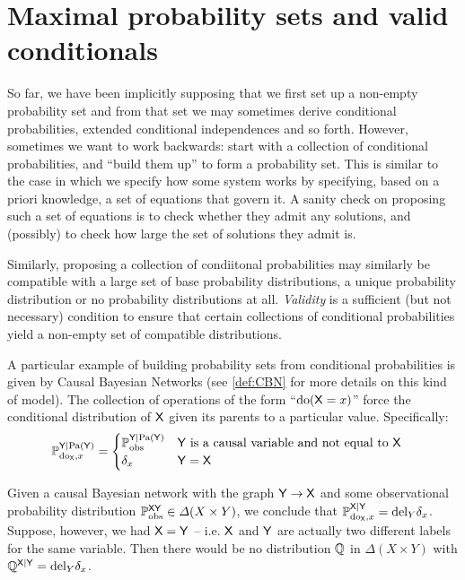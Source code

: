 \section{Maximal probability sets and valid conditionals}\label{sec:validity}

So far, we have been implicitly supposing that we first set up a non-empty probability set and from that set we may sometimes derive conditional probabilities, extended conditional independences and so forth. However, sometimes we want to work backwards: start with a collection of conditional probabilities, and ``build them up'' to form a probability set. This is similar to the case in which we specify how some system works by specifying, based on a priori knowledge, a set of equations that govern it. A sanity check on proposing such a set of equations is to check whether they admit any solutions, and (possibly) to check how large the set of solutions they admit is.

Similarly, proposing a collection of condiitonal probabilities may similarly be compatible with a large set of base probability distributions, a unique probability distribution or no probability distributions at all. \emph{Validity} is a sufficient (but not necessary) condition to ensure that certain collections of conditional probabilities yield a non-empty set of compatible distributions.

A particular example of building probability sets from conditional probabilities is given by Causal Bayesian Networks (see \ref{def:CBN} for more details on this kind of model). The collection of operations of the form ``$\mathrm{do}(\mathsf{X}=x)$'' force the conditional distribution of $\mathsf{X}$ given its parents to a particular value. Specifically:
\begin{align}
	\mathbb{P}_{\mathrm{do}_{\mathsf{X}},x}^{\mathsf{Y}|\mathrm{Pa}(\mathsf{Y})} &= \begin{cases}
	\mathbb{P}_{\mathrm{obs}}^{\mathsf{Y}|\mathrm{Pa}(\mathsf{Y})}&\mathsf{Y}\text{ is a causal variable and not equal to }\mathsf{X}\\
	\delta_x & \mathsf{Y}=\mathsf{X}
	\end{cases}
\end{align}

Given a causal Bayesian network with the graph $\mathsf{Y}\rightarrow \mathsf{X}$ and some observational probability distribution $\mathbb{P}_{\mathrm{obs}}^{\mathsf{XY}}\in\Delta(X\times Y)$, we conclude that $\mathbb{P}_{\mathrm{do}_{\mathsf{X}},x}^{\mathsf{X}|\mathsf{Y}}=\text{del}_Y \delta_x$. Suppose, however, we had $\mathsf{X}=\mathsf{Y}$ -- i.e. $\mathsf{X}$ and $\mathsf{Y}$ are actually two different labels for the same variable. Then there would be no distribution $\mathbb{Q}$ in $\Delta(X\times Y)$ with $\mathbb{Q}^{\mathsf{X}|\mathsf{Y}}=\text{del}_Y \delta_x$.

